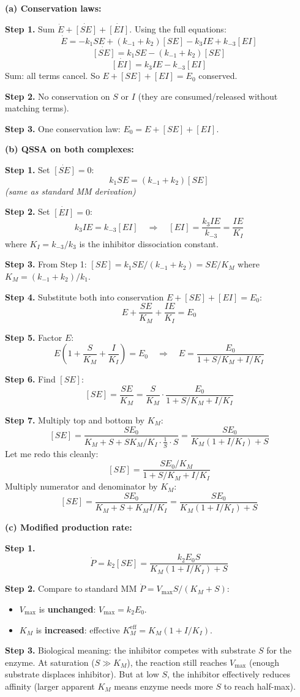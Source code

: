 \documentclass[10pt]{article}
\newcommand{\thus}{\quad\Longrightarrow\quad}
\newcommand{\stepwhy}[1]{\textcolor{blue!60!black}{\small\textit{(#1)}}}
\begin{document}
\begin{solution}
\textbf{(a) Conservation laws:}

\textbf{Step 1.} Sum $\dot E + \dot{[SE]} + \dot{[EI]}$. Using the full equations:
\[
\dot E = -k_1 SE + (k_{-1}+k_2)[SE] - k_3 IE + k_{-3}[EI]
\]
\[
\dot{[SE]} = k_1 SE - (k_{-1}+k_2)[SE]
\]
\[
\dot{[EI]} = k_3 IE - k_{-3}[EI]
\]
Sum: all terms cancel. So $E + [SE] + [EI] = E_0$ conserved.

\textbf{Step 2.} No conservation on $S$ or $I$ (they are consumed/released without matching terms).

\textbf{Step 3.} One conservation law: $E_0 = E + [SE] + [EI]$.

\medskip\textbf{(b) QSSA on both complexes:}

\textbf{Step 1.} Set $\dot{[SE]} = 0$:
\[
k_1 SE = (k_{-1}+k_2)[SE]
\]
\stepwhy{same as standard MM derivation}

\textbf{Step 2.} Set $\dot{[EI]} = 0$:
\[
k_3 IE = k_{-3}[EI] \thus [EI] = \frac{k_3 IE}{k_{-3}} = \frac{IE}{K_I}
\]
where $K_I = k_{-3}/k_3$ is the inhibitor dissociation constant.

\textbf{Step 3.} From Step 1: $[SE] = k_1 SE/(k_{-1}+k_2) = SE/K_M$ where $K_M = (k_{-1}+k_2)/k_1$.

\textbf{Step 4.} Substitute both into conservation $E + [SE] + [EI] = E_0$:
\[
E + \frac{SE}{K_M} + \frac{IE}{K_I} = E_0
\]

\textbf{Step 5.} Factor $E$:
\[
E\left(1 + \frac{S}{K_M} + \frac{I}{K_I}\right) = E_0 \thus E = \frac{E_0}{1 + S/K_M + I/K_I}
\]

\textbf{Step 6.} Find $[SE]$:
\[
[SE] = \frac{SE}{K_M} = \frac{S}{K_M}\cdot\frac{E_0}{1 + S/K_M + I/K_I}
\]

\textbf{Step 7.} Multiply top and bottom by $K_M$:
\[
[SE] = \frac{SE_0}{K_M + S + SK_M/K_I\cdot\frac{1}{S}\cdot S} = \frac{SE_0}{K_M(1+I/K_I) + S}
\]
Let me redo this cleanly:
\[
[SE] = \frac{S E_0 / K_M}{1 + S/K_M + I/K_I}
\]
Multiply numerator and denominator by $K_M$:
\[
[SE] = \frac{S E_0}{K_M + S + K_M I/K_I} = \frac{SE_0}{K_M(1 + I/K_I) + S}
\]

\medskip\textbf{(c) Modified production rate:}

\textbf{Step 1.}
\[
\dot P = k_2[SE] = \frac{k_2 E_0 S}{K_M(1+I/K_I) + S}
\]

\textbf{Step 2.} Compare to standard MM $\dot P = V_{\max}S/(K_M + S)$:
\begin{itemize}
\item $V_{\max}$ is \textbf{unchanged}: $V_{\max} = k_2 E_0$.
\item $K_M$ is \textbf{increased}: effective $K_M^{\text{eff}} = K_M(1 + I/K_I)$.
\end{itemize}

\textbf{Step 3.} Biological meaning: the inhibitor competes with substrate $S$ for the enzyme. At saturation ($S \gg K_M$), the reaction still reaches $V_{\max}$ (enough substrate displaces inhibitor). But at low $S$, the inhibitor effectively reduces affinity (larger apparent $K_M$ means enzyme needs more $S$ to reach half-max).
\end{solution}
\end{document}
